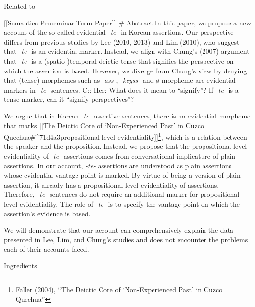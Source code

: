 Related to

{[}{[}Semantics Proseminar Term Paper{]}{]} \# Abstract In this paper,
we propose a new account of the so-called evidential \emph{-te-} in
Korean assertions. Our perspective differs from previous studies by Lee
(2010, 2013) and Lim (2010), who suggest that \emph{-te-} is an
evidential marker. Instead, we align with Chung's (2007) argument that
\emph{-te-} is a (spatio-)temporal deictic tense that signifies the
perspective on which the assertion is based. However, we diverge from
Chung's view by denying that (tense) morphemes such as \emph{-ass-},
\emph{-keyss-} and ø-morpheme are evidential markers in \emph{-te-}
sentences. C:: Hee: What does it mean to ``signify''? If \emph{-te-} is
a tense marker, can it ``signify perspectives''?

We argue that in Korean \emph{-te-} assertive sentences, there is no
evidential morpheme that marks {[}{[}The Deictic Core of
`Non‐Experienced Past' in Cuzco
Quechua\#\^{}71d4a3\textbar propositional-level
evidentiality{]}{]}\footnote{Faller (2004), ``The Deictic Core of
  `Non‐Experienced Past' in Cuzco Quechua''}, which is a relation
between the speaker and the proposition. Instead, we propose that the
propositional-level evidentiality of \emph{-te-} assertions comes from
conversational implicature of plain assertions. In our account,
\emph{-te-} assertions are understood as plain assertions whose
evidential vantage point is marked. By virtue of being a version of
plain assertion, it already has a propositional-level evidentiality of
assertions. Therefore, \emph{-te-} sentences do not require an
additional marker for propositional-level evidentiality. The role of
\emph{-te-} is to specify the vantage point on which the assertion's
evidence is based.

We will demonstrate that our account can comprehensively explain the
data presented in Lee, Lim, and Chung's studies and does not encounter
the problems each of their accounts faced.

Ingredients

